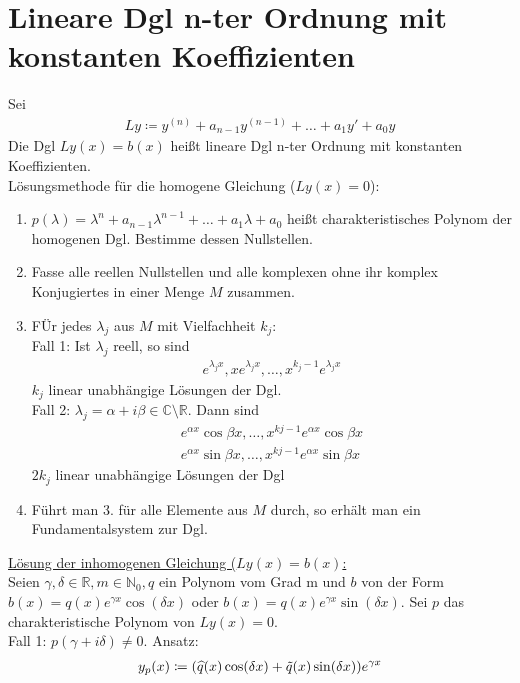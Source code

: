\documentclass{article}
\begin{document}
\section{Lineare Dgl n-ter Ordnung mit konstanten Koeffizienten}
Sei 
\begin{align*}
    Ly \coloneqq y^{(n)} + a_{n-1}y^{(n-1)}+ \ldots + a_1y' + a_0y
\end{align*}
Die Dgl $Ly(x)=b(x)$ heißt lineare Dgl n-ter Ordnung mit konstanten Koeffizienten. \\
Lösungsmethode für die homogene Gleichung ($Ly(x)=0$):
\begin{enumerate}
    \item $p(\lambda)=\lambda^n + a_{n-1}\lambda^{n-1} + \ldots + a_1\lambda + a_0$ heißt charakteristisches Polynom der homogenen Dgl.
    Bestimme dessen Nullstellen.
    \item Fasse alle reellen Nullstellen und alle komplexen ohne ihr komplex Konjugiertes in einer Menge $M$ zusammen.
    \item FÜr jedes $\lambda_j$ aus $M$ mit Vielfachheit $k_j$: \\
    Fall 1: Ist $\lambda_j$ reell, so sind
    \begin{align*}
        e^{\lambda_jx}, xe^{\lambda_jx}, \ldots, x^{k_j-1}e^{\lambda_jx}
    \end{align*}
    $k_j$ linear unabhängige Lösungen der Dgl. \\
    Fall 2: $\lambda_j = \alpha+i\beta \in \mathbb{C} \setminus \mathbb{R}$. Dann sind
    \begin{align*}
        e^{\alpha x}\cos \beta x, \ldots, x^{kj-1}e^{\alpha x}\cos \beta x \\
        e^{\alpha x}\sin \beta x, \ldots, x^{kj-1}e^{\alpha x}\sin \beta x
    \end{align*}
    $2k_j$ linear unabhängige Lösungen der Dgl
    \item Führt man 3. für alle Elemente aus $M$ durch, so erhält man ein Fundamentalsystem zur Dgl.
\end{enumerate}
\underline{Lösung der inhomogenen Gleichung ($Ly(x)=b(x)$:} \\
Seien $\gamma,\delta \in \mathbb{R}, m \in \mathbb{N}_0,q$ ein Polynom vom Grad m und $b$ von der Form $b(x)=q(x)e^{\gamma x}\cos(\delta x)$
oder $b(x)=q(x)e^{\gamma x}\sin(\delta x)$. Sei $p$ das charakteristische Polynom von $Ly(x)=0$. \\
Fall 1: $p(\gamma + i\delta) \neq 0$. Ansatz:
\begin{align*}
    y_p(x) \coloneqq (\widehat{q}(x)\cos(\delta x) + \Tilde{q}(x)\sin(\delta x))e^{\gamma x}
\end{align*}
\end{document}
